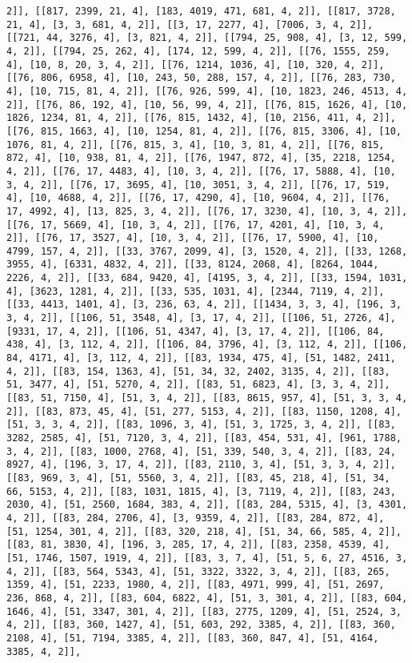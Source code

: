 \documentclass[12pt,fleqn]{article}\usepackage{../../common}
\begin{document}
\begin{verbatim}
2]], [[817, 2399, 21, 4], [183, 4019, 471, 681, 4, 2]], [[817, 3728, 21, 4], [3, 3, 681, 4, 2]], [[3, 17, 2277, 4], [7006, 3, 4, 2]], [[721, 44, 3276, 4], [3, 821, 4, 2]], [[794, 25, 908, 4], [3, 12, 599, 4, 2]], [[794, 25, 262, 4], [174, 12, 599, 4, 2]], [[76, 1555, 259, 4], [10, 8, 20, 3, 4, 2]], [[76, 1214, 1036, 4], [10, 320, 4, 2]], [[76, 806, 6958, 4], [10, 243, 50, 288, 157, 4, 2]], [[76, 283, 730, 4], [10, 715, 81, 4, 2]], [[76, 926, 599, 4], [10, 1823, 246, 4513, 4, 2]], [[76, 86, 192, 4], [10, 56, 99, 4, 2]], [[76, 815, 1626, 4], [10, 1826, 1234, 81, 4, 2]], [[76, 815, 1432, 4], [10, 2156, 411, 4, 2]], [[76, 815, 1663, 4], [10, 1254, 81, 4, 2]], [[76, 815, 3306, 4], [10, 1076, 81, 4, 2]], [[76, 815, 3, 4], [10, 3, 81, 4, 2]], [[76, 815, 872, 4], [10, 938, 81, 4, 2]], [[76, 1947, 872, 4], [35, 2218, 1254, 4, 2]], [[76, 17, 4483, 4], [10, 3, 4, 2]], [[76, 17, 5888, 4], [10, 3, 4, 2]], [[76, 17, 3695, 4], [10, 3051, 3, 4, 2]], [[76, 17, 519, 4], [10, 4688, 4, 2]], [[76, 17, 4290, 4], [10, 9604, 4, 2]], [[76, 17, 4992, 4], [13, 825, 3, 4, 2]], [[76, 17, 3230, 4], [10, 3, 4, 2]], [[76, 17, 5669, 4], [10, 3, 4, 2]], [[76, 17, 4201, 4], [10, 3, 4, 2]], [[76, 17, 3527, 4], [10, 3, 4, 2]], [[76, 17, 5900, 4], [10, 4799, 157, 4, 2]], [[33, 3767, 2099, 4], [3, 1520, 4, 2]], [[33, 1268, 3955, 4], [6331, 4832, 4, 2]], [[33, 8124, 2068, 4], [8264, 1044, 2226, 4, 2]], [[33, 684, 9420, 4], [4195, 3, 4, 2]], [[33, 1594, 1031, 4], [3623, 1281, 4, 2]], [[33, 535, 1031, 4], [2344, 7119, 4, 2]], [[33, 4413, 1401, 4], [3, 236, 63, 4, 2]], [[1434, 3, 3, 4], [196, 3, 3, 4, 2]], [[106, 51, 3548, 4], [3, 17, 4, 2]], [[106, 51, 2726, 4], [9331, 17, 4, 2]], [[106, 51, 4347, 4], [3, 17, 4, 2]], [[106, 84, 438, 4], [3, 112, 4, 2]], [[106, 84, 3796, 4], [3, 112, 4, 2]], [[106, 84, 4171, 4], [3, 112, 4, 2]], [[83, 1934, 475, 4], [51, 1482, 2411, 4, 2]], [[83, 154, 1363, 4], [51, 34, 32, 2402, 3135, 4, 2]], [[83, 51, 3477, 4], [51, 5270, 4, 2]], [[83, 51, 6823, 4], [3, 3, 4, 2]], [[83, 51, 7150, 4], [51, 3, 4, 2]], [[83, 8615, 957, 4], [51, 3, 3, 4, 2]], [[83, 873, 45, 4], [51, 277, 5153, 4, 2]], [[83, 1150, 1208, 4], [51, 3, 3, 4, 2]], [[83, 1096, 3, 4], [51, 3, 1725, 3, 4, 2]], [[83, 3282, 2585, 4], [51, 7120, 3, 4, 2]], [[83, 454, 531, 4], [961, 1788, 3, 4, 2]], [[83, 1000, 2768, 4], [51, 339, 540, 3, 4, 2]], [[83, 24, 8927, 4], [196, 3, 17, 4, 2]], [[83, 2110, 3, 4], [51, 3, 3, 4, 2]], [[83, 969, 3, 4], [51, 5560, 3, 4, 2]], [[83, 45, 218, 4], [51, 34, 66, 5153, 4, 2]], [[83, 1031, 1815, 4], [3, 7119, 4, 2]], [[83, 243, 2030, 4], [51, 2560, 1684, 383, 4, 2]], [[83, 284, 5315, 4], [3, 4301, 4, 2]], [[83, 284, 2706, 4], [3, 9359, 4, 2]], [[83, 284, 872, 4], [51, 1254, 301, 4, 2]], [[83, 320, 218, 4], [51, 34, 66, 585, 4, 2]], [[83, 81, 3830, 4], [196, 3, 285, 17, 4, 2]], [[83, 2358, 4539, 4], [51, 1746, 1507, 1919, 4, 2]], [[83, 3, 7, 4], [51, 5, 6, 27, 4516, 3, 4, 2]], [[83, 564, 5343, 4], [51, 3322, 3322, 3, 4, 2]], [[83, 265, 1359, 4], [51, 2233, 1980, 4, 2]], [[83, 4971, 999, 4], [51, 2697, 236, 868, 4, 2]], [[83, 604, 6822, 4], [51, 3, 301, 4, 2]], [[83, 604, 1646, 4], [51, 3347, 301, 4, 2]], [[83, 2775, 1209, 4], [51, 2524, 3, 4, 2]], [[83, 360, 1427, 4], [51, 603, 292, 3385, 4, 2]], [[83, 360, 2108, 4], [51, 7194, 3385, 4, 2]], [[83, 360, 847, 4], [51, 4164, 3385, 4, 2]], 
\end{verbatim}
\end{document}

